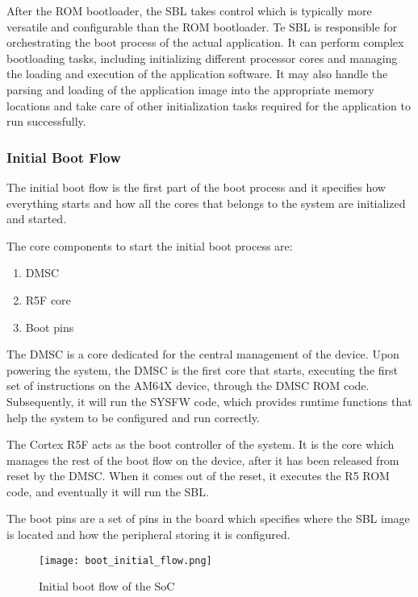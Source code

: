 After the ROM bootloader, the SBL takes control which is typically more
versatile and configurable than the ROM bootloader.
Te SBL is responsible for orchestrating the boot process of the actual
application.
It can perform complex bootloading tasks, including initializing different
processor cores and managing the loading and execution of the application
software. It may also handle the parsing and loading of the application image
into the appropriate memory locations and take care of other initialization
tasks required for the application to run successfully.

\subsubsection{Initial Boot Flow}

The initial boot flow is the first part of the boot process and it specifies
how everything starts and how all the cores that belongs to the system are
initialized and started.

The core components to start the initial boot process are:

\begin{enumerate}
    \item   DMSC
    \item   R5F core
    \item   Boot pins
\end{enumerate}

The DMSC is a core dedicated for the central management of the device.
\cite{Technical_reference_AM64}
Upon powering the system, the DMSC is the first core that starts, executing 
the first set of instructions on the AM64X device, through the DMSC ROM code.
Subsequently, it will run the SYSFW code, which provides runtime functions that
help the system to be configured and run correctly.

The Cortex R5F acts as the boot controller of the system.
It is the core which manages the rest of the boot flow on the device, after it
has been released from reset by the DMSC. When it comes out of the reset, it
executes the R5 ROM code, and eventually it will run the SBL.

The boot pins are a set of pins in the board which specifies where the SBL
image is located and how the peripheral storing it is configured. 

\begin{figure}[ht]
    \centering
    \texttt{[image: boot\_initial\_flow.png]}
    \caption{Initial boot flow of the SoC}
\end{figure}

